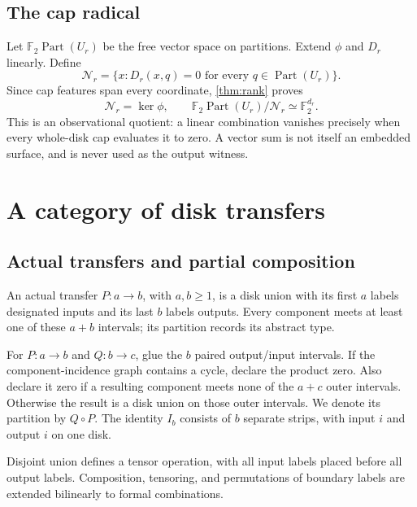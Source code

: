 \documentclass[11pt,a4paper]{article}
\theoremstyle{definition}
\newcommand{\F}{\mathbb F_2}
\newcommand{\Part}{\operatorname{Part}}
\begin{document}
\subsection{The cap radical}
Let $\F\Part(U_r)$ be the free vector space on partitions. Extend $\phi$ and $D_r$ linearly. Define
\[
\mathcal N_r=\{x:D_r(x,q)=0\text{ for every }q\in\Part(U_r)\}.
\]
Since cap features span every coordinate, \cref{thm:rank} proves
\begin{equation}
\mathcal N_r=\ker\phi,\qquad
\F\Part(U_r)/\mathcal N_r\simeq\F^{d_r}.
\label{eq:radical}
\end{equation}
This is an observational quotient: a linear combination vanishes precisely when every whole-disk cap evaluates it to zero. A vector sum is not itself an embedded surface, and is never used as the output witness.

\section{A category of disk transfers}\label{sec:category}

\subsection{Actual transfers and partial composition}
An actual transfer $P:a\to b$, with $a,b\ge1$, is a disk union with its first $a$ labels designated inputs and its last $b$ labels outputs. Every component meets at least one of these $a+b$ intervals; its partition records its abstract type.

For $P:a\to b$ and $Q:b\to c$, glue the $b$ paired output/input intervals. If the component-incidence graph contains a cycle, declare the product zero. Also declare it zero if a resulting component meets none of the $a+c$ outer intervals. Otherwise the result is a disk union on those outer intervals. We denote its partition by $Q\circ P$. The identity $I_b$ consists of $b$ separate strips, with input $i$ and output $i$ on one disk.

Disjoint union defines a tensor operation, with all input labels placed before all output labels. Composition, tensoring, and permutations of boundary labels are extended bilinearly to formal combinations.
\end{document}
